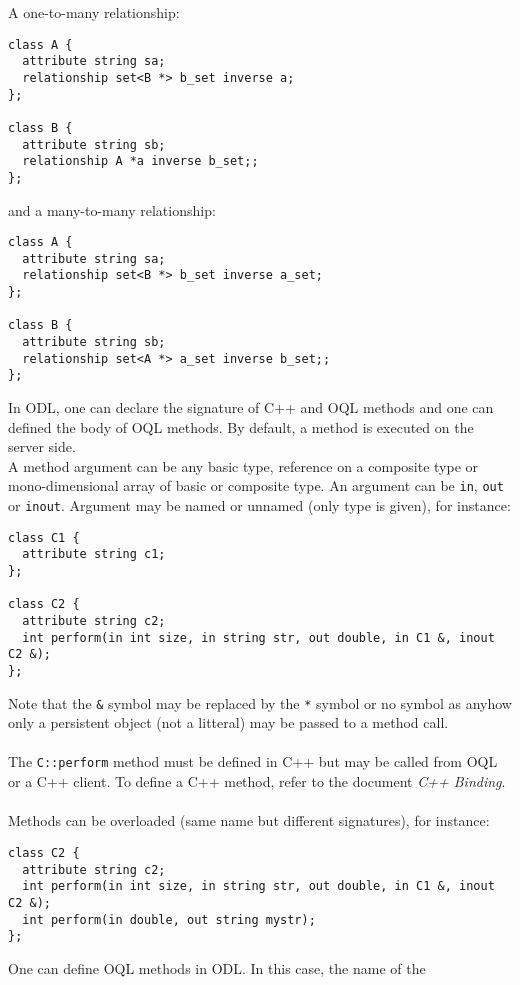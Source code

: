A one-to-many relationship:
\vspace{-0.2cm}
\begin{verbatim}
class A {
  attribute string sa;
  relationship set<B *> b_set inverse a;
};

class B {
  attribute string sb;
  relationship A *a inverse b_set;;
};
\end{verbatim}
and a many-to-many relationship:
\vspace{-0.2cm}
\begin{verbatim}
class A {
  attribute string sa;
  relationship set<B *> b_set inverse a_set;
};

class B {
  attribute string sb;
  relationship set<A *> a_set inverse b_set;;
};
\end{verbatim}

In ODL, one can declare the signature of C++ and OQL methods
and one can defined the body of OQL methods.
By default, a method is executed on the server side.
\\
A method argument can be any basic type, reference on a composite type or
mono-dimensional array of basic or composite type. An argument
can be \texttt{in}, \texttt{out} or \texttt{inout}.
Argument may be named or unnamed (only type is given), for instance:
\vspace{-0.2cm}
\begin{verbatim}
class C1 {
  attribute string c1;
};

class C2 {
  attribute string c2;
  int perform(in int size, in string str, out double, in C1 &, inout C2 &);
};
\end{verbatim}
Note that the \texttt{\&} symbol may be replaced by the \texttt{*} symbol
or no symbol as anyhow only a persistent object (not a litteral) may
be passed to a method call.
\\
\\
The \texttt{C::perform} method must be defined in C++ but may be called
from OQL or a C++ client. To define a C++ method, refer to the
document \emph{C++ Binding}.
\\
\\
Methods can be overloaded (same name but different signatures), for instance:
\vspace{-0.2cm}
\begin{verbatim}
class C2 {
  attribute string c2;
  int perform(in int size, in string str, out double, in C1 &, inout C2 &);
  int perform(in double, out string mystr);
};
\end{verbatim}
One can define OQL methods in ODL. In this case, the name of the

